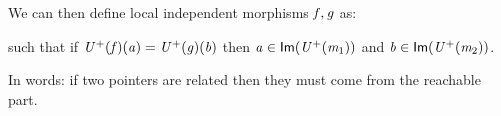 We can then define local independent morphisms $\mathit{f}, \mathit{g}$ as:

\begin{center}
\end{center}

\begin{center}
\end{center}
such that if $\mathit{U}^+(\mathit{f})(\mathit{a}) = \mathit{U}^+(\mathit{g})(\mathit{b})$ then $\mathit{a} \in \mathsf{Im}(\mathit{U}^+(\mathit{m}_1))$ and $\mathit{b} \in \mathsf{Im}(\mathit{U}^+(\mathit{m}_2))$.

In words: if two pointers are related then they must come from the reachable part.
